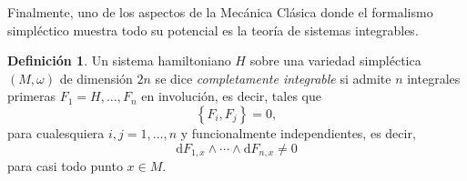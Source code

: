 \documentclass[12pt,a4paper,twoside]{article}
\theoremstyle{definition} \newtheorem{defn}[thm]{Definición}
\theoremstyle{definition} \newtheorem{ejemplo}[thm]{Ejemplo}
\theoremstyle{definition} \newtheorem{ejercicio}[thm]{Ejercicio}
\theoremstyle{remark} \newtheorem*{obs}{Observación}
\def\dd{\mathrm{d}}
\begin{document}
  Finalmente, uno de los aspectos de la Mecánica Clásica donde el formalismo simpléctico muestra todo su potencial es la teoría de sistemas integrables. 
  \begin{defn}
    Un sistema hamiltoniano $H$ sobre una variedad simpléctica $(M,\omega)$ de dimensión $2n$ se dice \emph{completamente integrable} si admite $n$ integrales primeras $F_1=H,\dots,F_n$ en involución, es decir, tales que
    \begin{equation}
      \left\{ F_i,F_j \right\}=0,  
    \end{equation}
    para cualesquiera $i,j=1,\dots,n$ y funcionalmente independientes, es decir,
    \begin{equation}
      \dd F_{1,x} \wedge \cdots \wedge \dd F_{n,x}\neq 0
    \end{equation}
    para casi todo punto $x\in M$.
  \end{defn}
\end{document}
